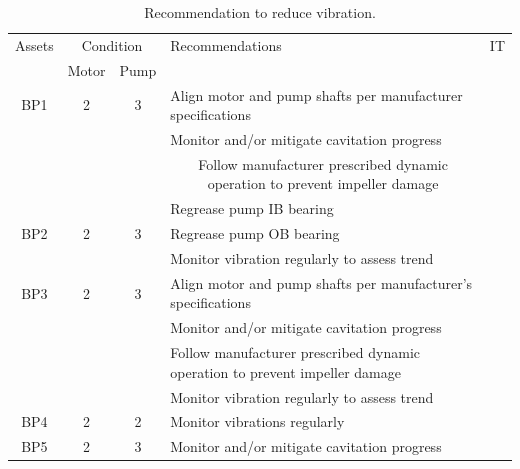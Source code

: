 \begin{table}[!h]
	\caption{Recommendation to reduce vibration.}
	\label{ch05_tbl_vibrationre}
	{\footnotesize
\begin{tabular}{l|l|l|l|c}
	\hline
	\multicolumn{1}{c|}{Assets} & \multicolumn{2}{c}{Condition} & Recommendations & IT \\ 
	\cline{2-3}
	\multicolumn{1}{c|}{} & \multicolumn{1}{c|}{Motor} & \multicolumn{1}{c|}{Pump} & \multicolumn{1}{c|}{} &  \\ 
	\hline
	\multicolumn{1}{c|}{BP1} & \multicolumn{1}{c|}{2} & \multicolumn{1}{c|}{3} & Align motor and pump shafts per manufacturer specifications &  \\ 
	\multicolumn{1}{c|}{} & \multicolumn{1}{c|}{} & \multicolumn{1}{c|}{} & Monitor and/or mitigate cavitation progress &  \\ 
	\multicolumn{1}{c|}{} & \multicolumn{1}{c|}{} & \multicolumn{1}{c|}{} & \multicolumn{1}{c|}{Follow manufacturer prescribed dynamic operation to prevent impeller damage} &  \\ 
	\multicolumn{1}{c|}{} & \multicolumn{1}{c|}{} & \multicolumn{1}{c|}{} & Regrease pump IB bearing &  \\ 
	\hline
	\multicolumn{1}{c|}{BP2} & \multicolumn{1}{c|}{2} & \multicolumn{1}{c|}{3} & Regrease pump OB bearing &  \\ 
	\multicolumn{1}{c|}{} & \multicolumn{1}{c|}{} & \multicolumn{1}{c|}{} & Monitor vibration regularly to assess trend &  \\ 
	\hline
	\multicolumn{1}{c|}{BP3} & \multicolumn{1}{c|}{2} & \multicolumn{1}{c|}{3} & Align motor and pump shafts per manufacturer's specifications &  \\ 
	\multicolumn{1}{c|}{} & \multicolumn{1}{c|}{} & \multicolumn{1}{c|}{} & Monitor and/or mitigate cavitation progress &  \\ 
	\multicolumn{1}{c|}{} & \multicolumn{1}{c|}{} & \multicolumn{1}{c|}{} & Follow manufacturer prescribed dynamic operation to prevent impeller damage &  \\ 
	\multicolumn{1}{c|}{} & \multicolumn{1}{c|}{} & \multicolumn{1}{c|}{} & Monitor vibration regularly to assess trend &  \\ 
	\hline
	\multicolumn{1}{c|}{BP4} & \multicolumn{1}{c|}{2} & \multicolumn{1}{c|}{2} & Monitor vibrations regularly &  \\ 
	\hline
	\multicolumn{1}{c|}{BP5} & \multicolumn{1}{c|}{2} & \multicolumn{1}{c|}{3} & Monitor and/or mitigate cavitation progress &  \\ 

\end{tabular}}
\end{table}
